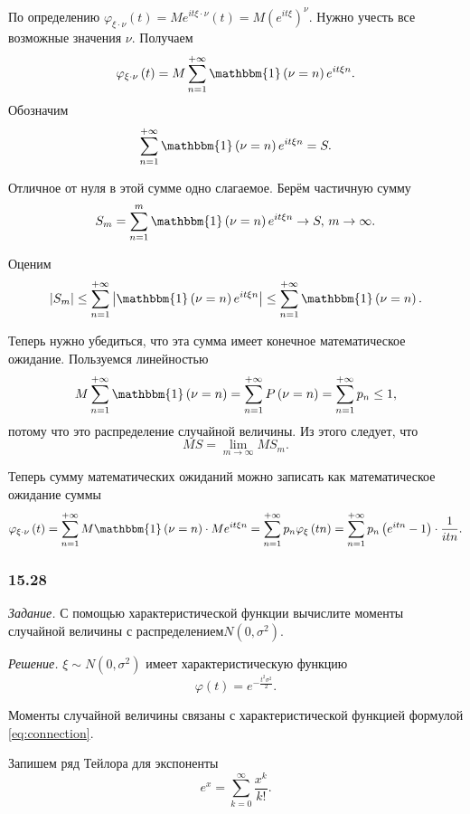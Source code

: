 По определению
$ \varphi_{ \xi \cdot \nu } \left( t \right) =
  Me^{it \xi \cdot \nu } \left( t \right) =
  M \left( e^{it \xi} \right)^{ \nu }.$
Нужно учесть все возможные значения $ \nu $.
Получаем
$$ \varphi_{ \xi \cdot \nu } \left( t \right) =
  M \sum \limits_{n = 1}^{+ \infty } \mathbbm{1} \left( \nu = n \right) e^{it \xi n}.$$
Обозначим
$$ \sum \limits_{n = 1}^{+ \infty } \mathbbm{1} \left( \nu = n \right) e^{it \xi n} =
  S.$$

Отличное от нуля в этой сумме одно слагаемое.
Берём частичную сумму
$$S_m =
  \sum \limits_{n = 1}^{m} \mathbbm{1} \left( \nu = n \right) e^{it \xi n} \rightarrow S, \,
  m \rightarrow \infty.$$

Оценим
$$ \left| S_m \right| \leq
  \sum \limits_{n = 1}^{+ \infty }
    \left| \mathbbm{1} \left( \nu = n \right) e^{it \xi n} \right| \leq
  \sum \limits_{n = 1}^{+ \infty } \mathbbm{1} \left( \nu = n \right).$$

Теперь нужно убедиться, что эта сумма имеет конечное математическое ожидание.
Пользуемся линейностью
$$M \sum \limits_{n = 1}^{+ \infty } \mathbbm{1} \left( \nu = n \right) =
  \sum \limits_{n = 1}^{+ \infty } P \left( \nu = n \right) =
  \sum \limits_{n = 1}^{+ \infty } p_n \leq
  1,$$
потому что это распределение случайной величины.
Из этого следует, что
$$MS =
  \lim \limits_{m \to \infty } MS_m.$$

Теперь сумму математических ожиданий можно записать как математическое ожидание суммы
$$ \varphi_{ \xi \cdot \nu } \left( t \right) =
  \sum \limits_{n = 1}^{+ \infty } M \mathbbm{1} \left( \nu = n \right) \cdot Me^{it \xi n} =
  \sum \limits_{n = 1}^{+ \infty } p_n \varphi_{ \xi } \left( tn \right) =
  \sum \limits_{n = 1}^{+ \infty } p_n \left( e^{itn} - 1 \right) \cdot \frac{1}{itn}.$$

\subsubsection*{15.28}

\textit{Задание.}
С помощью характеристической функции вычислите моменты случайной величины с распределением$N \left( 0, \sigma^2 \right) $.

\textit{Решение.} $ \xi \sim N \left( 0, \sigma^2 \right) $ имеет характеристическую функцию
$$ \varphi \left( t \right) =
  e^{- \frac{t^2 \sigma^2}{2}}.$$

Моменты случайной величины связаны с характеристической функцией формулой \eqref{eq:connection}.

Запишем ряд Тейлора для экспоненты
$$e^x =
  \sum \limits_{k = 0}^{ \infty } \frac{x^k}{k!}.$$

